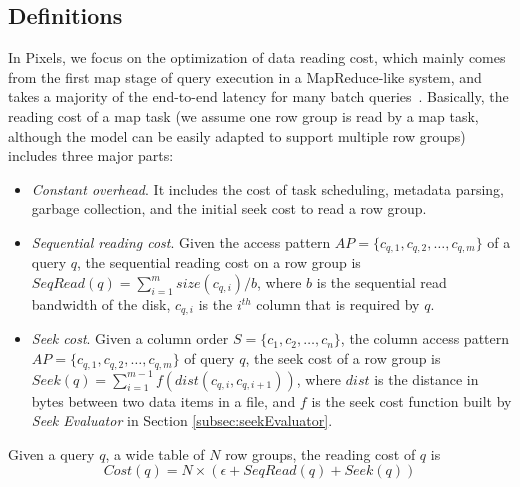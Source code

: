 
\subsection{Definitions}

In Pixels, we focus on the optimization of data reading cost, which mainly comes from the first map stage of query execution in a MapReduce-like system, and takes a majority of the end-to-end latency for many batch queries~\cite{ColumnOrdering}. Basically, the reading cost of a map task (we assume one row group is read by a map task, although the model can be easily adapted to support multiple row groups) includes three major parts:
\begin{itemize}
	\item \textit{Constant overhead}. It includes the cost of task scheduling, metadata parsing, garbage collection, and the initial seek cost to read a row group.
	
	\item \textit{Sequential reading cost}. Given the access pattern $AP=\{c_{q,1},c_{q,2},\dots,c_{q,m}\}$ of a query $q$, the sequential reading cost on a row group is $SeqRead(q)=\sum_{i=1}^{m}size(c_{q,i})/b$, where $b$ is the sequential read bandwidth of the disk, $c_{q,i}$ is the $i^{th}$ column that is required by $q$.
	
	\item \textit{Seek cost}. Given a column order $S=\{c_1, c_2,\dots,c_n\}$, the column access pattern $AP=\{c_{q,1},c_{q,2},\dots,c_{q,m}\}$ of query $q$, the seek cost of a row group is \\$Seek(q)=\sum_{i=1}^{m-1}f(dist(c_{q,i},c_{q,i+1}))$, where $dist$ is the distance in bytes between two data items in a file, and $f$ is the seek cost function built by \textit{Seek Evaluator} in Section \ref{subsec:seekEvaluator}.
\end{itemize}

\begin{Definition}\label{equ:qcost}
	Given a query $q$, a wide table of $N$ row groups, the reading cost of $q$ is
	\begin{equation}
	Cost(q) = N\times(\epsilon+SeqRead(q)+Seek(q))
	\label{equ:querycost}
	\end{equation}
\end{Definition}

